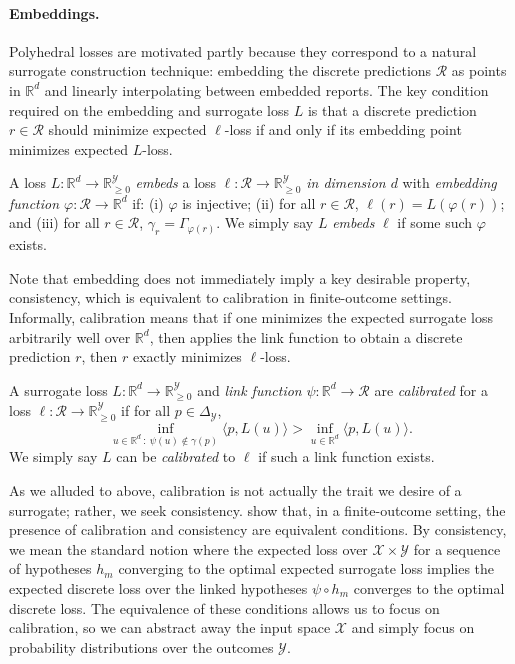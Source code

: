 \documentclass[anon]{colt2020} %
\newcommand{\reals}{\mathbb{R}}
\newcommand{\nonnegreals}{\reals_{\geq 0}}%
\newcommand{\simplex}{\Delta_\Y}
\newcommand{\R}{\mathcal{R}}
\newcommand{\X}{\mathcal{X}}
\newcommand{\Y}{\mathcal{Y}}
\newcommand{\inprod}[2]{\langle #1, #2 \rangle}%
\begin{document}
\paragraph{Embeddings.}
Polyhedral losses are motivated partly because they correspond to a natural surrogate construction technique: embedding the discrete predictions $\R$ as points in $\reals^d$ and linearly interpolating between embedded reports.
The key condition required on the embedding and surrogate loss $L$ is that a discrete prediction $r \in \R$ should minimize expected $\ell$-loss if and only if its embedding point minimizes expected $L$-loss.
%
\begin{definition}
  A loss $L: \reals^d \to \nonnegreals^{\Y}$ \emph{embeds} a loss $\ell: \R \to \nonnegreals^{\Y}$ \emph{in dimension $d$} with \emph{embedding function $\varphi: \R \to \reals^d$} if: (i) $\varphi$ is injective; (ii) for all $r \in \R$, $\ell(r) = L(\varphi(r))$; and (iii) for all $r \in \R$, $\gamma_r = \Gamma_{\varphi(r)}$.
  We simply say $L$ \emph{embeds} $\ell$ if some such $\varphi$ exists.
\end{definition}
%
Note that embedding does not immediately imply a key desirable property, consistency, which is equivalent to calibration in finite-outcome settings.
Informally, calibration means that if one minimizes the expected surrogate loss arbitrarily well over $\reals^d$, then applies the link function to obtain a discrete prediction $r$, then $r$ exactly minimizes $\ell$-loss.
\begin{definition}\label{def:calibration}
  A surrogate loss $L: \reals^d \to \nonnegreals^{\Y}$ and \emph{link function} $\psi: \reals^d \to \R$ are \emph{calibrated} for a loss $\ell: \R \to \nonnegreals^{\Y}$ if for all $p \in \simplex$,
    \[ \inf_{u \in \reals^d ~:~ \psi(u) \not\in \gamma(p)} \inprod{p}{L(u)}  > \inf_{u \in \reals^d} \inprod{p}{L(u)}  .\]
  We simply say $L$ can be \emph{calibrated} to $\ell$ if such a link function exists.
\end{definition}
As we alluded to above, calibration is not actually the trait we desire of a surrogate; rather, we seek consistency.
\cite{tewari2007consistency} show that, in a finite-outcome setting, the presence of calibration and consistency are equivalent conditions.
By consistency, we mean the standard notion where the expected loss over $\X \times \Y$ for a sequence of hypotheses $h_m$ converging to the optimal expected surrogate loss implies the expected discrete loss over the linked hypotheses $\psi \circ h_m$ converges to the optimal discrete loss.
The equivalence of these conditions allows us to focus on calibration, so we can abstract away the input space $\X$ and simply focus on probability distributions over the outcomes $\Y$.
\end{document}
